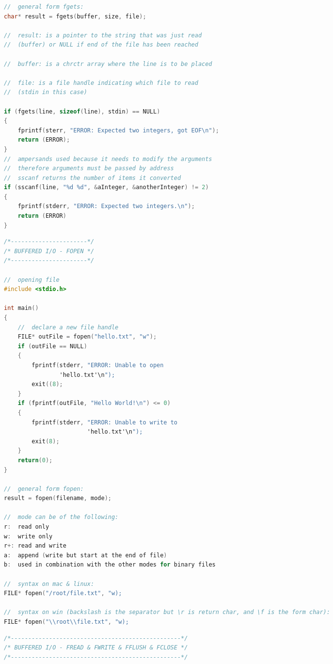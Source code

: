 \documentclass[8pt]{extarticle}
\begin{document}
\begin{small}
\begin{multicols}{2}
\begin{lstlisting}[language=C]
//  general form fgets:
char* result = fgets(buffer, size, file);

//  result: is a pointer to the string that was just read 
//  (buffer) or NULL if end of the file has been reached

//  buffer: is a chrctr array where the line is to be placed

//  file: is a file handle indicating which file to read
//  (stdin in this case)

if (fgets(line, sizeof(line), stdin) == NULL)
{
	fprintf(sterr, "ERROR: Expected two integers, got EOF\n");
	return (ERROR);
}
//  ampersands used because it needs to modify the arguments 
//  therefore arguments must be passed by address
//  sscanf returns the number of items it converted
if (sscanf(line, "%d %d", &aInteger, &anotherInteger) != 2)
{
	fprintf(stderr, "ERROR: Expected two integers.\n");
	return (ERROR)
}
\end{lstlisting}

\begin{lstlisting}[language=C]
/*----------------------*/
/* BUFFERED I/O - FOPEN */
/*----------------------*/

//  opening file
#include <stdio.h>

int main()
{
	//  declare a new file handle
	FILE* outFile = fopen("hello.txt", "w");
	if (outFile == NULL)
	{
		fprintf(stderr, "ERROR: Unable to open 
				'hello.txt'\n");
		exit((8);
	}
	if (fprintf(outFile, "Hello World!\n") <= 0)
	{
		fprintf(stderr, "ERROR: Unable to write to 
						'hello.txt'\n");
		exit(8);
	}
	return(0);
}

//  general form fopen:
result = fopen(filename, mode);

//  mode can be of the following:
r:	read only
w:	write only
r+:	read and write
a:	append (write but start at the end of file)
b:	used in combination with the other modes for binary files

//  syntax on mac & linux:
FILE* fopen("/root/file.txt", "w);

//  syntax on win (backslash is the separator but \r is return char, and \f is the form char):
FILE* fopen("\\root\\file.txt", "w);
\end{lstlisting}


\begin{lstlisting}[language=C]
/*-------------------------------------------------*/
/* BUFFERED I/O - FREAD & FWRITE & FFLUSH & FCLOSE */
/*-------------------------------------------------*/


\end{lstlisting}
\end{multicols}
\end{small}
\end{document}
